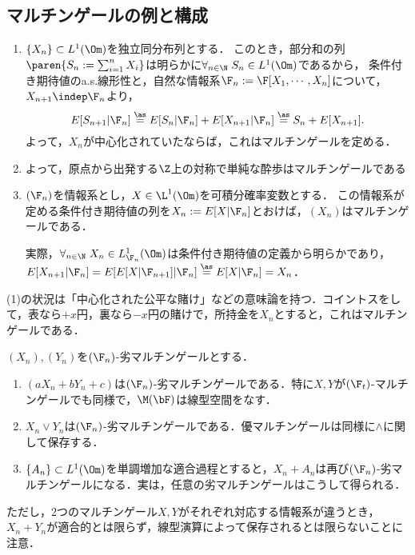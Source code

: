 \documentclass[uplatex,dvipdfmx]{jsreport}
\begin{document}
\subsection{マルチンゲールの例と構成}

\begin{example}\mbox{}
    \begin{enumerate}
        \item $\{X_n\}\subset L^1(\Om)$を独立同分布列とする．
        このとき，部分和の列$\paren{S_n:=\sum_{i=1}^nX_i}$は明らかに$\forall_{n\in\N}\;S_n\in L^1(\Om)$であるから，
        条件付き期待値のa.s.線形性と，自然な情報系$\F_n:=\F[X_1,\cdots,X_n]$について，$X_{n+1}\indep\F_n$より，
        \[E[S_{n+1}|\F_n]\overset{\as}{=}E[S_n|\F_n]+E[X_{n+1}|\F_n]\overset{\as}{=}S_n+E[X_{n+1}].\]
        よって，$X_n$が中心化されていたならば，これはマルチンゲールを定める．
        \item よって，原点から出発する$\Z$上の対称で単純な酔歩はマルチンゲールである
        \item $(\F_n)$を情報系とし，$X\in\L^1(\Om)$を可積分確率変数とする．
        この情報系が定める条件付き期待値の列を$X_n:=E[X|\F_n]$とおけば，$(X_n)$はマルチンゲールである．
        
        実際，$\forall_{n\in\N}\;X_n\in L^1_{\F_n}(\Om)$は条件付き期待値の定義から明らかであり，
        $E[X_{n+1}|\F_n]=E[E[X|\F_{n+1}]|\F_n]\overset{\as}{=}E[X|\F_n]=X_n$．
    \end{enumerate}
    (1)の状況は「中心化された公平な賭け」などの意味論を持つ．コイントスをして，表なら$+x$円，裏なら$-x$円の賭けで，所持金を$X_n$とすると，これはマルチンゲールである．
\end{example}

\begin{lemma}[マルチンゲールの線型束演算に関する保存]
    $(X_n),(Y_n)$を$(\F_n)$-劣マルチンゲールとする．
    \begin{enumerate}
        \item $(aX_n+bY_n+c)$は$(\F_n)$-劣マルチンゲールである．特に$X,Y$が$(\F_t)$-マルチンゲールでも同様で，$\M(\bF)$は線型空間をなす．
        \item $X_n\lor Y_n$は$(\F_n)$-劣マルチンゲールである．優マルチンゲールは同様に$\land$に関して保存する．
        \item $\{A_n\}\subset L^1(\Om)$を単調増加な適合過程とすると，$X_n+A_n$は再び$(\F_n)$-劣マルチンゲールになる．実は，任意の劣マルチンゲールはこうして得られる．
    \end{enumerate}
    ただし，2つのマルチンゲール$X,Y$がそれぞれ対応する情報系が違うとき，$X_n+Y_n$が適合的とは限らず，線型演算によって保存されるとは限らないことに注意．
\end{lemma}
\end{document}
